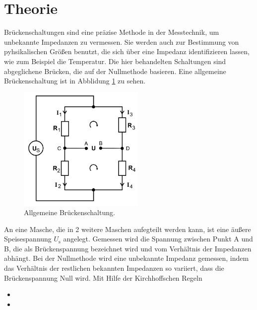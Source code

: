 \section{Theorie}
\label{sec:Theorie}

Brückenschaltungen sind eine präzise Methode in der Messtechnik, um unbekannte Impedanzen zu vermessen.
Sie werden auch zur Bestimmung von pyhsikalischen Größen benutzt, die sich über eine Impedanz identifizieren lassen, wie zum Beispiel die Temperatur.
Die hier behandelten Schaltungen sind abgeglichene Brücken, die auf der Nullmethode basieren.
Eine allgemeine Brückenschaltung ist in Abblidung \ref{fig:Schaltung1} zu sehen.
\begin{figure}
  \includegraphics[height=6cm]{data/Schaltung1.jpg}
  \centering
  \caption{Allgemeine Brückenschaltung.}
  \label{fig:Schaltung1}
\end{figure}
An eine Masche, die in 2 weitere Maschen aufegteilt werden kann, ist eine äußere Speisespannung $U_{\text{s}}$ angelegt.
Gemessen wird die Spannung zwischen Punkt A und B, die als Brückenspannung bezeichnet wird und vom Verhältnis der Impedanzen abhängt.
Bei der Nullmethode wird eine unbekannte Impedanz gemessen, indem das Verhältnis der restlichen bekannten Impedanzen so variiert, dass die Brückenspannung Null wird.
Mit Hilfe der Kirchhoffschen Regeln
\begin{itemize}
  \item {}
  \item {}
\end{itemize}
